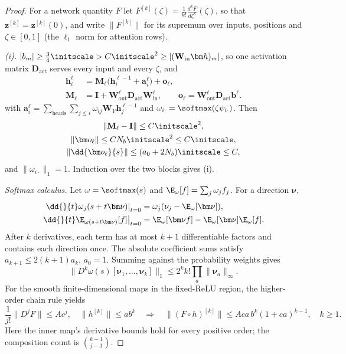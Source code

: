 \begin{proof}
For a network quantity $F$ let $F^{[k]}(\zeta)=\frac{1}{k!}\frac{d^kF}{d\zeta^k}(\zeta)$, so that $\bm z^{[k]}=\bm z^{[k]}(0)$, and write $\|F^{[k]}\|$ for its supremum over
inputs, positions and $\zeta\in[0,1]$ (the $\ell_1$ norm for attention rows).

\emph{(i).} $|b_m|\ge\frac{3}{4}\initscale>C\initscale^2\ge|(\mathbf W_{\mathrm{in}}\bm h)_m|$, so one activation matrix $\mathbf D_{\mathrm{act}}$ serves every input and every $\zeta$, and
\[
 \begin{aligned}
 \bm h_i^\ell&=\mathbf M_\ell\bigl(\bm h_i^{\ell-1}+\bm a_i^\ell\bigr)+\bm o_\ell,\\
 \mathbf M_\ell&=\mathbf I+\mathbf W^\ell_{\mathrm{out}}\mathbf D_{\mathrm{act}}\mathbf W^\ell_{\mathrm{in}},\qquad
 \bm o_\ell=\mathbf W^\ell_{\mathrm{out}}\mathbf D_{\mathrm{act}}\bm b^\ell.
 \end{aligned}
\]
with $\bm a_i^\ell=\sum_{\mathrm{heads}}\sum_{j\le i}\omega_{ij}\mathbf W_V\bm h^{\ell-1}_j$ and $\omega_{i\cdot}=\softmax(\zeta\psi_{i\cdot})$. Then
 \[
\begin{gathered}
\|\mathbf M_\ell-\mathbf I\|\le C\initscale^2,\\ \|\bm o_\ell\|\le CN_b\initscale^2\le C\initscale,\\ \|\dd{\bm o_\ell}{s}\|\le(a_0+2N_b)\initscale\le C,
\end{gathered}
\] 
and $\|\omega_{i\cdot}\|_1=1$. Induction over the two blocks gives (i).

\emph{Softmax calculus.} Let $\omega=\softmax(s)$ and
$\E_\omega[f]=\sum_j\omega_jf_j$. For a direction $\bm\nu$,
\begin{align*}
 \left.\dd{}{t}\omega_j(s+t\bm\nu)\right|_{t=0}
 &=\omega_j(\nu_j-\E_\omega[\bm\nu]),\\
 \left.\dd{}{t}\E_{\omega(s+t\bm\nu)}[f]\right|_{t=0}
 &=\E_\omega[\bm\nu f]-\E_\omega[\bm\nu]\E_\omega[f].
\end{align*}
After $k$ derivatives, each term has at most $k+1$ differentiable factors
and contains each direction once. The absolute coefficient sums satisfy
$a_{k+1}\le2(k+1)a_k$, $a_0=1$. Summing against the probability weights gives
\begin{equation}
 \bigl\|D^k\omega(s)[\bm\nu_1,\ldots,\bm\nu_k]\bigr\|_1\le2^kk!\prod_a\|\bm\nu_a\|_\infty .
 \label{eq:softmax-avg}
\end{equation}
For the smooth finite-dimensional maps in the fixed-ReLU region, the
higher-order chain rule \citep[Theorem~2]{clark2013faa} yields
\[
 \frac{1}{j!}\|D^jF\|\le Ac^j,\quad \|h^{[k]}\|\le ab^k
 \quad\Longrightarrow\quad
 \|(F\circ h)^{[k]}\|\le Aca\,b^k(1+ca)^{k-1},\quad k\ge1.
\]
Here the inner map's derivative bounds hold for every positive order; the
composition count is $\binom{k-1}{j-1}$.


\end{proof}
